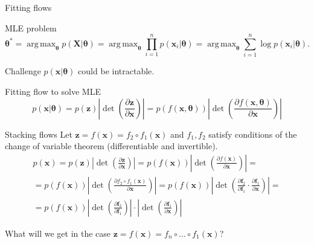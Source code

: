 \documentclass{beamer}
\newcommand{\bx}{\mathbf{x}}
\newcommand{\bz}{\mathbf{z}}
\newcommand{\bX}{\mathbf{X}}
\newcommand{\btheta}{\boldsymbol{\theta}}
\DeclareMathOperator*{\argmax}{arg\,max}
\begin{document}
\begin{frame}{Fitting flows}
	\begin{block}{MLE problem}
		\vspace{-0.3cm}
		\[
		\btheta^* = \argmax_{\btheta} p(\bX | \btheta) = \argmax_{\btheta} \prod_{i=1}^n p(\bx_i | \btheta) = \argmax_{\btheta} \sum_{i=1}^n \log p(\bx_i | \btheta).
		\]
		\vspace{-0.3cm}
	\end{block}
	\begin{block}{Challenge}
		$p(\bx | \btheta)$ could be intractable.
	\end{block}
	\begin{block}{Fitting flow to solve MLE}
		\[
		p(\bx|\btheta) = p(\bz) \left|\det \left(  \frac{\partial \bz}{\partial \bx} \right) \right|  = p(f(\bx, \btheta)) \left|\det \left( \frac{\partial f(\bx, \btheta)}{\partial \bx} \right) \right|
		\]
	\end{block}
\end{frame}
\begin{frame}{Stacking flows}
	Let $\bz = f(\bx) = f_2 \circ f_1(\bx)$ and $f_1, f_2$ satisfy conditions of the change of variable theorem (differentiable and invertible).
	\begin{multline*}
		p(\bx) = p(\bz) \left|\det \left(  \frac{\partial \bz}{\partial \bx} \right) \right| = p(f(\bx)) \left|\det \left(  \frac{\partial f(\bx)}{\partial \bx} \right) \right| = \\
		= p(f(\bx)) \left|\det \left(\frac{\partial f_2 \circ f_1(\bx)}{\partial \bx} \right) \right| =
		p(f(\bx)) \left|\det \left(\frac{\partial \textbf{f}_2}{\partial \textbf{f}_1} \cdot \frac{\partial \textbf{f}_1}{\partial \bx} \right) \right| = \\
		= p(f(\bx))  \left|\det \left(\frac{\partial \textbf{f}_2}{\partial \textbf{f}_1} \right) \right| \cdot \left| \det \left( \frac{\partial \textbf{f}_1}{\partial \bx} \right) \right|
	\end{multline*}

	What will we get in the case $\bz = f(\bx) = f_n \circ \dots \circ f_1(\bx)$?
\end{frame}
\end{document}
